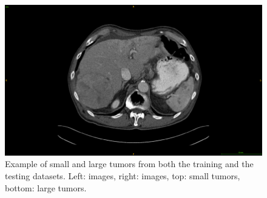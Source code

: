 \begin{figure}[!ht]
\begin{minipage}{0.45\linewidth}
	\end{minipage} \hspace{-0.1cm}
	\begin{minipage}{0.45\linewidth}
		\includegraphics[width=\linewidth]{../Contributions/images/ResizeTCIA_examplePatientLargeTumor}
	\end{minipage}
	\caption{Example of small and large tumors from both the training and the testing datasets. Left: \textbf{} images, right: \textbf{} images, top: small tumors, bottom: large tumors.}
	\label{fig:interdb_tumorExamples}
\end{figure}
